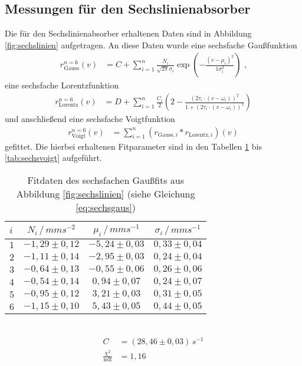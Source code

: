 \subsection{Messungen für den Sechslinienabsorber}

Die für den Sechslinienabsorber erhaltenen Daten sind in Abbildung \ref{fig:sechslinien} aufgetragen. An diese Daten wurde eine sechsfache Gaußfunktion
\begin{align}
r_\mathrm{Gauss}^{n=6}(v)&=C+\sum_{i=1}^n\frac{N_i}{\sqrt{2\pi}\sigma_i}\exp(-\frac{(v-\mu_i)^2}{1\sigma_i^2})\text{ ,}\label{eq:sechsgaus}
\end{align}
eine sechsfache Lorentzfunktion 
\begin{align}
r_\mathrm{Lorentz}^{n=6}(v)&=D+\sum_{i=1}^n\frac{C_i}{2}\left(2-\frac{\left(2\tau_i\cdot(v-\omega_i)\right)^2}{1+\left(2\tau_i\cdot(v-\omega_i)\right)^2}\right)\label{eq:sechslorentz}
\end{align}
und anschließend eine sechsfache Voigtfunktion 
\begin{align}
r_\mathrm{Voigt}^{n=6}(v)&=\sum_{i=1}^n\left(r_{\mathrm{Gauss}, i}*r_{\mathrm{Lorentz}, i}\right)(v)\label{eq:sechsvoigt}
\end{align}
gefittet. Die hierbei erhaltenen Fitparameter sind in den Tabellen \ref{tab:sechsgaus} bis \ref{tab:sechsvoigt} aufgeführt.

\begin{table}[h!]
	\centering
	\begin{tabular}{l|ccc}
		$i$&$N_i\,/\,\si{mms^{-2}}$&$\mu_i\,/\,\si{mms^{-1}}$&$\sigma_i\,/\,\si{mms^{-1}}$\\\hline
		$1$&$-1,29\pm0,12$&$-5,24\pm0,03$&$0,33\pm0,04$\\
		$2$&$-1,11\pm0,14$&$-2,95\pm0,03$&$0,24\pm0,04$\\
		$3$&$-0,64\pm0,13$&$-0,55\pm0,06$&$0,26\pm0,06$\\
		$4$&$-0,54\pm0,14$&$ 0,94\pm0,07$&$0,24\pm0,07$\\
		$5$&$-0,95\pm0,12$&$ 3,21\pm0,03$&$0,31\pm0,05$\\
		$6$&$-1,15\pm0,10$&$ 5,43\pm0,05$&$0,44\pm0,05$\\
	\end{tabular}\\
	\begin{align*}
		C&=(28,46\pm0,03)\,\si{s^{-1}}\\
		\frac{\chi^2}{\mathrm{ndf}}&=1,16
	\end{align*}
	\caption{Fitdaten des sechsfachen Gaußfits aus Abbildung \ref{fig:sechslinien} (siehe Gleichung \ref{eq:sechsgaus})}
	\label{tab:sechsgaus}
\end{table}

